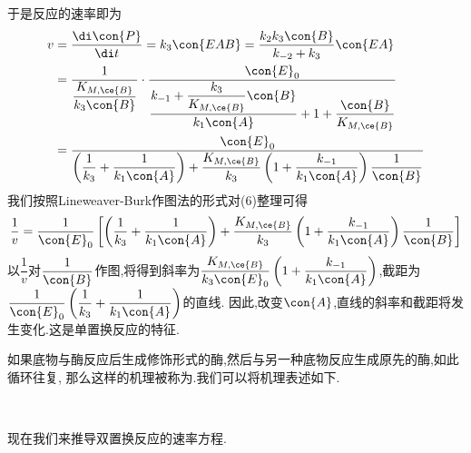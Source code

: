 \documentclass{ctexart}
\begin{document}
\begin{derivation}
\begin{equation}
    \end{equation}
    于是反应的速率即为
    \begin{equation}
        \begin{aligned}
            v
            &= \dfrac{\di\con{P}}{\di t}=k_3\con{EAB}=\dfrac{k_2k_3\con{B}}{k_{-2}+k_3}\con{EA} \\
            &= \dfrac{1}{\dfrac{K_{M,\ce{B}}}{k_3\con{B}}}\cdot\dfrac{\con{E}_0}{\dfrac{k_{-1}+\dfrac{k_3}{K_{M,\ce{B}}}\con{B}}{k_1\con{A}}+1+\dfrac{\con{B}}{K_{M,\ce{B}}}} \\
            &= \dfrac{\con{E}_0}{\left(\dfrac{1}{k_3}+\dfrac{1}{k_1\con{A}}\right)+\dfrac{K_{M,\ce{B}}}{k_3}\left(1+\dfrac{k_{-1}}{k_1\con{A}}\right)\dfrac{1}{\con{B}}}
        \end{aligned}
    \end{equation}
    我们按照Lineweaver-Burk作图法的形式对(6)整理可得
    \begin{equation}
        \dfrac{1}{v}
        =\dfrac{1}{\con{E}_0}\left[\left(\dfrac{1}{k_3}+\dfrac{1}{k_1\con{A}}\right)+\dfrac{K_{M,\ce{B}}}{k_3}\left(1+\dfrac{k_{-1}}{k_1\con{A}}\right)\dfrac{1}{\con{B}}\right]
    \end{equation}
    以$\dfrac{1}{v}$对$\dfrac{1}{\con{B}}$作图,将得到斜率为$\dfrac{K_{M,\ce{B}}}{k_3\con{E}_0}\left(1+\dfrac{k_{-1}}{k_1\con{A}}\right)$,截距为$\dfrac{1}{\con{E}_0}\left(\dfrac{1}{k_3}+\dfrac{1}{k_1\con{A}}\right)$的直线.%
    因此,改变$\con{A}$,直线的斜率和截距将发生变化.这是单置换反应的特征.
\end{derivation}
如果底物与酶反应后生成修饰形式的酶,然后与另一种底物反应生成原先的酶,如此循环往复,%
那么这样的机理被称为.我们可以将机理表述如下.
\begin{tightcenter}
    \\
\end{tightcenter}
现在我们来推导双置换反应的速率方程.
\end{document}
